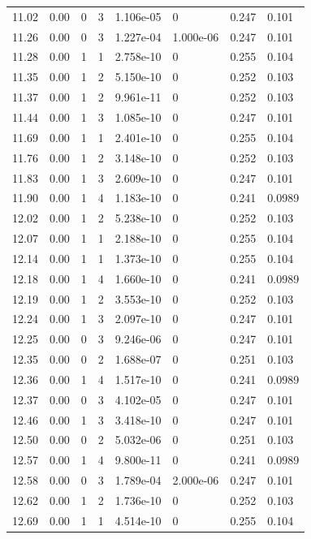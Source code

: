 \documentclass[preview]{standalone}
\begin{document}
{{{\begin{tabular}{L{1.2cm}C{1.2cm} C{0.3cm}C{0.5cm} C{1.4cm}C{1.4cm} C{1.4cm}C{1.4cm}}
  11.02  &  0.00  & 0     &  3 &  1.106e-05  & 0  & 0.247 &  0.101   \\ 
  11.26  &  0.00  & 0     &  3 &  1.227e-04  & 1.000e-06  & 0.247 &  0.101   \\ 
  11.28  &  0.00  & 1     &  1 &  2.758e-10  & 0  & 0.255 &  0.104   \\ 
  11.35  &  0.00  & 1     &  2 &  5.150e-10  & 0  & 0.252 &  0.103   \\ 
  11.37  &  0.00  & 1     &  2 &  9.961e-11  & 0  & 0.252 &  0.103   \\ 
  11.44  &  0.00  & 1     &  3 &  1.085e-10  & 0  & 0.247 &  0.101   \\ 
  11.69  &  0.00  & 1     &  1 &  2.401e-10  & 0  & 0.255 &  0.104   \\ 
  11.76  &  0.00  & 1     &  2 &  3.148e-10  & 0  & 0.252 &  0.103   \\ 
  11.83  &  0.00  & 1     &  3 &  2.609e-10  & 0  & 0.247 &  0.101   \\ 
  11.90  &  0.00  & 1     &  4 &  1.183e-10  & 0  & 0.241 &  0.0989   \\ 
  12.02  &  0.00  & 1     &  2 &  5.238e-10  & 0  & 0.252 &  0.103   \\ 
  12.07  &  0.00  & 1     &  1 &  2.188e-10  & 0  & 0.255 &  0.104   \\ 
  12.14  &  0.00  & 1     &  1 &  1.373e-10  & 0  & 0.255 &  0.104   \\ 
  12.18  &  0.00  & 1     &  4 &  1.660e-10  & 0  & 0.241 &  0.0989   \\ 
  12.19  &  0.00  & 1     &  2 &  3.553e-10  & 0  & 0.252 &  0.103   \\ 
  12.24  &  0.00  & 1     &  3 &  2.097e-10  & 0  & 0.247 &  0.101   \\ 
  12.25  &  0.00  & 0     &  3 &  9.246e-06  & 0  & 0.247 &  0.101   \\ 
  12.35  &  0.00  & 0     &  2 &  1.688e-07  & 0  & 0.251 &  0.103   \\ 
  12.36  &  0.00  & 1     &  4 &  1.517e-10  & 0  & 0.241 &  0.0989   \\ 
  12.37  &  0.00  & 0     &  3 &  4.102e-05  & 0  & 0.247 &  0.101   \\ 
  12.46  &  0.00  & 1     &  3 &  3.418e-10  & 0  & 0.247 &  0.101   \\ 
  12.50  &  0.00  & 0     &  2 &  5.032e-06  & 0  & 0.251 &  0.103   \\ 
  12.57  &  0.00  & 1     &  4 &  9.800e-11  & 0  & 0.241 &  0.0989   \\ 
  12.58  &  0.00  & 0     &  3 &  1.789e-04  & 2.000e-06  & 0.247 &  0.101   \\ 
  12.62  &  0.00  & 1     &  2 &  1.736e-10  & 0  & 0.252 &  0.103   \\ 
  12.69  &  0.00  & 1     &  1 &  4.514e-10  & 0  & 0.255 &  0.104   \\ 
\hline 
\end{tabular} 

}}}
\end{document}
